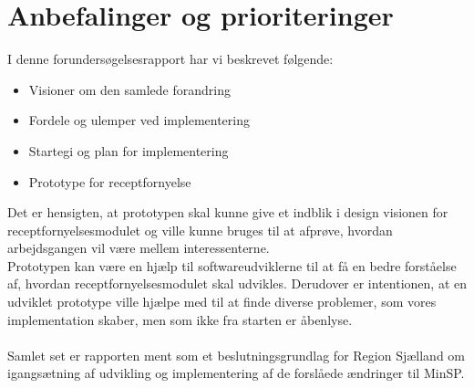 \section{Anbefalinger og prioriteringer}
I denne forundersøgelsesrapport har vi beskrevet følgende:
\begin{itemize}
	\item Visioner om den samlede forandring
	\item Fordele og ulemper ved implementering
	\item Startegi og plan for implementering
	\item Prototype for receptfornyelse
\end{itemize}
Det er hensigten, at prototypen skal kunne give et indblik i design visionen for receptfornyelsesmodulet og ville kunne bruges til at afprøve, hvordan arbejdsgangen vil være mellem interessenterne.\\
Prototypen kan være en hjælp til softwareudviklerne til at få en bedre forståelse af, hvordan receptfornyelsesmodulet skal udvikles. Derudover er intentionen, at en udviklet prototype ville hjælpe med til at finde diverse problemer, som vores implementation skaber, men som ikke fra starten er åbenlyse. \\\\
Samlet set er rapporten ment som et beslutningsgrundlag for Region Sjælland om igangsætning af udvikling og implementering af de forslåede ændringer til MinSP.
